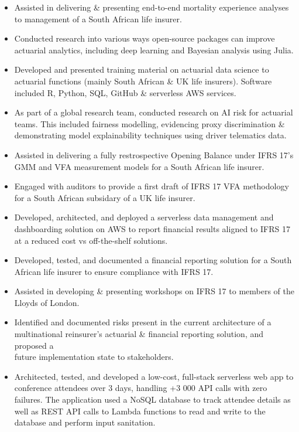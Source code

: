 \documentclass[10pt,a4paper,ragged2e,withhyper]{altacv}
\begin{document}
\begin{paracol}{2}
  \smallskip
  \bigskip
  \medskip
  \smallskip
  \begin{itemize}[label=$\circ$, leftmargin=0.9cm, labelsep=0.43cm]
    \item Assisted in delivering \& presenting end-to-end mortality experience analyses to management of a South African life insurer.
    \item Conducted research into various ways open-source packages can improve actuarial analytics, including deep learning and Bayesian analysis using Julia.
    \item Developed and presented training material on actuarial data science to actuarial functions (mainly South African \& UK life insurers). Software included R, Python, SQL, GitHub \& serverless AWS services. 
    \item As part of a global research team, conducted research on AI risk for actuarial teams. This included fairness modelling, evidencing proxy discrimination \& demonstrating model explainability techniques using driver telematics data. 
  \end{itemize}
  \begin{itemize}[label=$\circ$, leftmargin=0.9cm, labelsep=0.43cm]
    \item Assisted in delivering a fully restrospective Opening Balance under IFRS 17's GMM and VFA measurement models for a South African life insurer. 
    \item Engaged with auditors to provide a first draft of IFRS 17 VFA methodology for a South African subsidary of a UK life insurer. 
    \item Developed, architected, and deployed a serverless data management and\\ dashboarding solution on AWS to report financial results aligned to IFRS 17 at a reduced cost vs off-the-shelf solutions.
    \item Developed, tested, and documented a financial reporting solution for a South African life insurer to ensure compliance with IFRS 17.
    \item Assisted in developing \& presenting workshops on IFRS 17 to members of the Lloyds of London. 

  \end{itemize}
  \begin{itemize}[label=$\circ$, leftmargin=0.9cm, labelsep=0.43cm]
    \item Identified and documented risks present in the current architecture of a multinational reinsurer's actuarial \& financial reporting solution, and proposed a\\ future implementation state to stakeholders.
    \item Architected, tested, and developed a low-cost, full-stack serverless web app to conference attendees over 3 days, handling +3 000 API calls with zero failures. The application used a NoSQL database to track attendee details as well as REST API calls to Lambda functions to read and write to the database and perform input sanitation.


\end{itemize}
\end{paracol}
\end{document}
